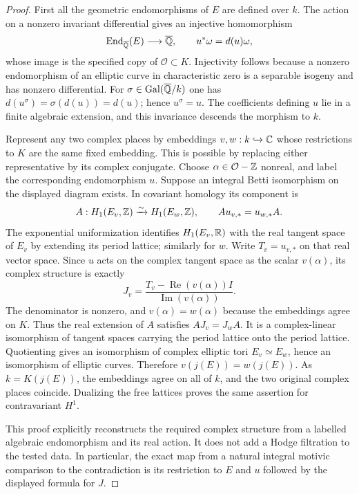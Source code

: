 \begin{proof}
First all the geometric endomorphisms of $E$ are defined over $k$. The action on a nonzero invariant differential gives an injective homomorphism
\[
 \operatorname{End}_{\overline{\mathbb Q}}(E)\longrightarrow\overline{\mathbb Q},
 \qquad u^*\omega=d(u)\omega,
\]
whose image is the specified copy of $\mathcal O\subset K$. Injectivity follows because a nonzero endomorphism of an elliptic curve in characteristic zero is a separable isogeny and has nonzero differential. For $\sigma\in\operatorname{Gal}(\overline{\mathbb Q}/k)$ one has $d(u^\sigma)=\sigma(d(u))=d(u)$; hence $u^\sigma=u$. The coefficients defining $u$ lie in a finite algebraic extension, and this invariance descends the morphism to $k$.

Represent any two complex places by embeddings $v,w:k\hookrightarrow\mathbb C$ whose restrictions to $K$ are the same fixed embedding. This is possible by replacing either representative by its complex conjugate. Choose $\alpha\in\mathcal O-\mathbb Z$ nonreal, and label the corresponding endomorphism $u$. Suppose an integral Betti isomorphism on the displayed diagram exists. In covariant homology its component is
\[
 A:H_1(E_v,\mathbb Z)\xrightarrow{\sim}H_1(E_w,\mathbb Z),
 \qquad A u_{v,*}=u_{w,*}A.
\]
The exponential uniformization identifies $H_1(E_v,\mathbb R)$ with the real tangent space of $E_v$ by extending its period lattice; similarly for $w$. Write $T_v=u_{v,*}$ on that real vector space. Since $u$ acts on the complex tangent space as the scalar $v(\alpha)$, its complex structure is exactly
\[
 J_v=\frac{T_v-\operatorname{Re}(v(\alpha))I}
                 {\operatorname{Im}(v(\alpha))}.
\]
The denominator is nonzero, and $v(\alpha)=w(\alpha)$ because the embeddings agree on $K$. Thus the real extension of $A$ satisfies $A J_v=J_w A$. It is a complex-linear isomorphism of tangent spaces carrying the period lattice onto the period lattice. Quotienting gives an isomorphism of complex elliptic tori $E_v\simeq E_w$, hence an isomorphism of elliptic curves. Therefore $v(j(E))=w(j(E))$. As $k=K(j(E))$, the embeddings agree on all of $k$, and the two original complex places coincide. Dualizing the free lattices proves the same assertion for contravariant $H^1$.

This proof explicitly reconstructs the required complex structure from a labelled algebraic endomorphism and its real action. It does not add a Hodge filtration to the tested data. In particular, the exact map from a natural integral motivic comparison to the contradiction is its restriction to $E$ and $u$ followed by the displayed formula for $J$.
\end{proof}

